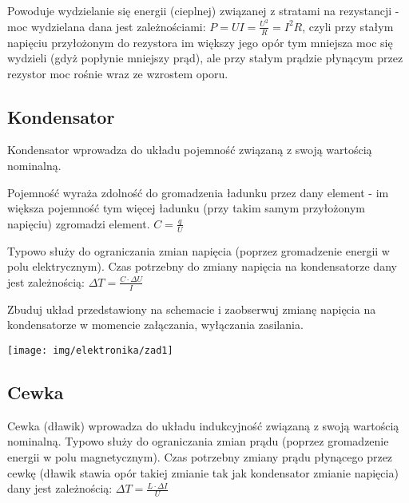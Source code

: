 \documentclass{pdfBooklets}
\begin{document}
Powoduje wydzielanie się energii (cieplnej) związanej z stratami na rezystancji - moc wydzielana dana jest zależnościami: $P = UI = \frac{U^2}{R} = I^2R$, czyli przy stałym napięciu przyłożonym do rezystora im większy jego opór tym mniejsza moc się wydzieli (gdyż popłynie mniejszy prąd), ale przy stałym prądzie płynącym przez rezystor moc rośnie wraz ze wzrostem oporu.


\subsection{Kondensator}
Kondensator wprowadza do układu pojemność związaną z swoją wartością nominalną. 

Pojemność wyraża zdolność do gromadzenia ładunku przez dany element - im większa pojemność tym więcej ładunku (przy takim samym przyłożonym napięciu) zgromadzi element. $C = \frac{q}{U}$

Typowo służy do ograniczania zmian napięcia (poprzez gromadzenie energii w polu elektrycznym). Czas potrzebny do zmiany napięcia na kondensatorze dany jest zależnością: $\Delta T = \frac{C \cdot \Delta U}{I}$

\begin{Zadanie}{}{}
\noindent\begin{minipage}[b]{0.55\textwidth}
Zbuduj układ przedstawiony na schemacie i zaobserwuj zmianę napięcia na kondensatorze w momencie załączania, wyłączania zasilania.
\vspace{1cm}
\end{minipage}
\hfill
\begin{minipage}[b]{0.4\textwidth}
\texttt{[image: img/elektronika/zad1]}
\end{minipage}
\end{Zadanie}

\subsection{Cewka}
Cewka (dławik) wprowadza do układu indukcyjność związaną z swoją wartością nominalną. Typowo służy do ograniczania zmian prądu (poprzez gromadzenie energii w polu magnetycznym). Czas potrzebny zmiany prądu płynącego przez cewkę (dławik stawia opór takiej zmianie tak jak kondensator zmianie napięcia) dany jest zależnością: $\Delta T = \frac{L \cdot \Delta I}{U}$
\end{document}
